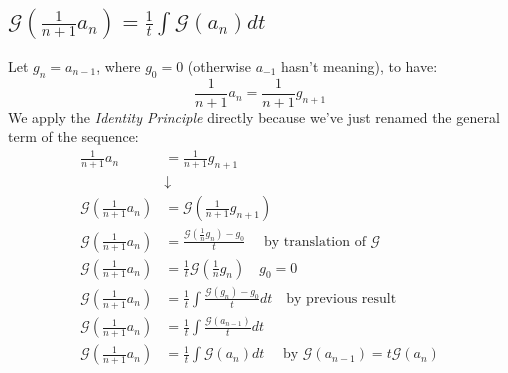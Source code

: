 \subsection{$\mathcal{G} ( \frac{1}{n+1} a_n) = \frac{1}{t} \int{
    \mathcal{G} (a_n)dt }$}

Let $g_n = a_{n-1}$, where $g_0 = 0$ (otherwise $a_{-1}$ hasn't
meaning), to have:
\begin{displaymath}
  \frac{1}{n+1} a_n = \frac{1}{n+1} g_{n+1}
\end{displaymath}
We apply the \emph{Identity Principle} directly because
we've just renamed the general term of the sequence:
\begin{displaymath}
  \begin{split}
    \frac{1}{n+1} a_n &= \frac{1}{n+1} g_{n+1} \\
    &\downarrow\\
    \mathcal{G} (\frac{1}{n+1} a_n) &= \mathcal{G} (\frac{1}{n+1}
    g_{n+1}) \\
    \mathcal{G} (\frac{1}{n+1} a_n) &= \frac{ \mathcal{G} (\frac{1}{n}
      g_n)-g_0}{t} \quad \text{ by translation of
    }\mathcal{G} \\
    \mathcal{G} (\frac{1}{n+1} a_n) &= \frac{1}{t} \mathcal{G}
    (\frac{1}{n} g_n)    \quad g_0 = 0\\
    \mathcal{G} (\frac{1}{n+1} a_n) &= \frac{1}{t} \int{
      \frac{\mathcal{G} (g_n) - g_0}{t}dt } \quad \text{by previous
      result}\\
    \mathcal{G} (\frac{1}{n+1} a_n) &= \frac{1}{t} \int{
      \frac{\mathcal{G} (a_{n-1})}{t}dt }\\
    \mathcal{G} (\frac{1}{n+1} a_n) &= \frac{1}{t} \int{ \mathcal{G}
      (a_{n})dt } \quad \text{ by } \mathcal{G} (a_{n-1}) = t
    \mathcal{G} (a_n)
  \end{split}
\end{displaymath}









